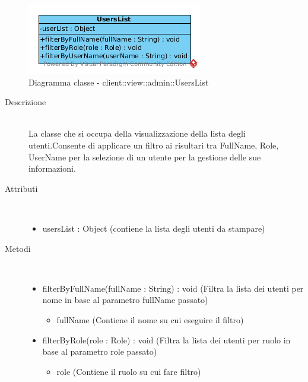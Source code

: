 \begin{center}
			\begin{figure}[H]
				\centering \includegraphics[scale=4, max width=\textwidth, max height=\myheight]{../img/diagrammiClassi/client/view/admin/UsersList.png}
				\caption{Diagramma classe - client::view::admin::UsersList}
			\end{figure}
		\end{center}\begin{description}
\item[Descrizione] \hfill \\
 La classe che si occupa della visualizzazione della lista degli utenti.Consente di applicare un filtro ai risultari tra FullName, Role, UserName per la selezione di un utente per la gestione delle sue informazioni.
\item[Attributi] \hfill \\
 \vspace{-7mm}
\begin{itemize}
\item usersList : Object (contiene la lista degli utenti da stampare)
\end{itemize}

\item[Metodi] \hfill \\
 \vspace{-7mm}
\begin{itemize}
\item filterByFullName(fullName : String) : void (Filtra la lista dei utenti per nome in base al parametro fullName passato)\begin{itemize}
\item fullName (Contiene il nome su cui eseguire il filtro)
\end{itemize}

\item filterByRole(role : Role) : void (Filtra la lista dei utenti per ruolo in base al parametro role passato)\begin{itemize}
\item role (Contiene il ruolo su cui fare filtro)
\end{itemize}


\end{itemize}
\end{description}
